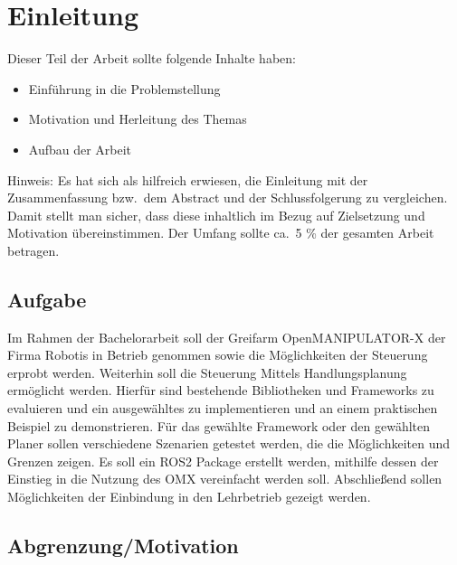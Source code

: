 \section{Einleitung} \label{einleitung}
Dieser Teil der Arbeit sollte folgende Inhalte haben:

\begin{itemize}
\item Einführung in die Problemstellung
\item Motivation und Herleitung des Themas
\item Aufbau der Arbeit
\end{itemize}

Hinweis:
Es hat sich als hilfreich erwiesen, die Einleitung mit der Zusammenfassung bzw.\ dem Abstract und der Schlussfolgerung zu vergleichen.
Damit stellt man sicher, dass diese inhaltlich im Bezug auf Zielsetzung und Motivation übereinstimmen.
Der Umfang sollte ca.\ 5 \% der gesamten Arbeit betragen.
\subsection{Aufgabe}
Im Rahmen der Bachelorarbeit soll der Greifarm OpenMANIPULATOR-X der Firma Robotis in Betrieb genommen sowie die Möglichkeiten der Steuerung erprobt werden.
Weiterhin soll die Steuerung Mittels Handlungsplanung ermöglicht werden.
Hierfür sind bestehende Bibliotheken und Frameworks zu evaluieren und ein ausgewähltes zu implementieren und an einem praktischen Beispiel zu demonstrieren.
Für das gewählte Framework oder den gewählten Planer sollen verschiedene Szenarien getestet werden, die die Möglichkeiten und Grenzen zeigen.
Es soll ein ROS2 Package erstellt werden, mithilfe dessen der Einstieg in die Nutzung des OMX vereinfacht werden soll.
Abschließend sollen Möglichkeiten der Einbindung in den Lehrbetrieb gezeigt werden.
\subsection{Abgrenzung/Motivation}

